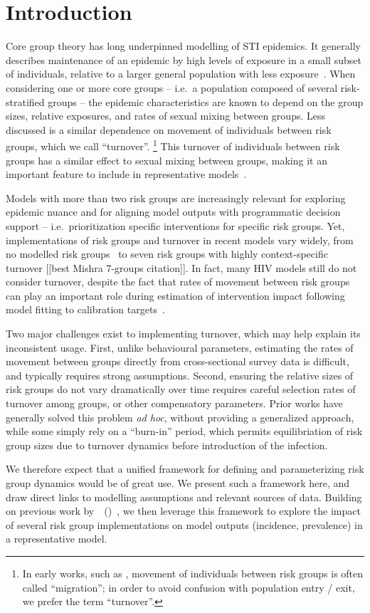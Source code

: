 \documentclass[10pt]{article}
\numberwithin{equation}{section}
\newcommand{\citet}[1]{\citeauthor{#1}~(\citeyear{#1})~\cite{#1}}
\begin{document}
\section{Introduction}\label{s:intro}
Core group theory has long underpinned modelling of STI epidemics.
It generally describes maintenance of an epidemic by
high levels of exposure in a small subset of individuals,
relative to a larger general population with less exposure~\cite{Yorke1978}.
When considering one or more core groups
-- i.e.\ a population composed of several risk-stratified groups --
the epidemic characteristics are known to depend on
the group sizes, relative exposures, and rates of sexual mixing between groups.
Less discussed is a similar dependence on
movement of individuals between risk groups, which we call ``turnover''.%
\footnote{In early works, such as \cite{Stigum1994},
  movement of individuals between risk groups is often called ``migration'';
  in order to avoid confusion with population entry / exit,
  we prefer the term ``turnover''.}
This turnover of individuals between risk groups has a similar effect to
sexual mixing between groups, making it
an important feature to include in representative models~\cite{Stigum1994}.
\par
Models with more than two risk groups
are increasingly relevant for exploring epidemic nuance
and for aligning model outputs with programmatic decision support
-- i.e.\ prioritization specific interventions for specific risk groups. %
Yet, implementations of risk groups and turnover in recent models vary widely,
from no modelled risk groups~\cite{Estill2012,Barnighausen2012}
to seven risk groups with highly context-specific turnover [[best Mishra 7-groups citation]].
In fact, many HIV models still do not consider turnover,
despite the fact that rates of movement between risk groups
can play an important role during estimation of intervention impact
following model fitting to calibration targets~\cite{Eaton2014}.
\par
Two major challenges exist to implementing turnover,
which may help explain its inconsistent usage.
First, unlike behavioural parameters,
estimating the rates of movement between groups
directly from cross-sectional survey data is difficult,
and typically requires strong assumptions.
Second, ensuring the relative sizes of risk groups do not vary
dramatically over time requires
careful selection rates of turnover among groups,
or other compensatory parameters.
Prior works have generally solved this problem \textit{ad hoc},
without providing a generalized approach,
while some simply rely on a ``burn-in'' period,
which permits equilibriation of risk group sizes due to turnover dynamics
before introduction of the infection.
\par
We therefore expect that a unified framework for
defining and parameterizing risk group dynamics
would be of great use.
We present such a framework here,
and draw direct links to modelling assumptions and relevant sources of data.
Building on previous work by~\citet{Stigum1994},
we then leverage this framework to explore the impact of
several risk group implementations on model outputs (incidence, prevalence)
in a representative model.
\end{document}
